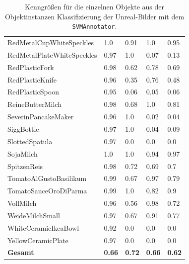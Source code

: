 \begin{table}
\begin{tabularx}{\textwidth}{Xllll}
RedMetalCupWhiteSpeckles & 1.0 & 0.91 & 1.0 & 0.95 \\  
RedMetalPlateWhiteSpeckles & 0.97 & 1.0 & 0.07 & 0.13 \\  
RedPlasticFork & 0.98 & 0.62 & 0.78 & 0.69 \\  
RedPlasticKnife & 0.96 & 0.35 & 0.76 & 0.48 \\  
RedPlasticSpoon & 0.95 & 0.06 & 0.05 & 0.06 \\  
ReineButterMilch & 0.98 & 0.68 & 1.0 & 0.81 \\  
SeverinPancakeMaker & 0.96 & 1.0 & 0.02 & 0.04 \\  
SiggBottle & 0.97 & 1.0 & 0.04 & 0.09 \\  
SlottedSpatula & 0.97 & 0.0 & 0.0 & 0.0 \\  
SojaMilch & 1.0 & 1.0 & 0.94 & 0.97 \\  
SpitzenReis & 0.98 & 0.72 & 0.69 & 0.7 \\  
TomatoAlGustoBasilikum & 0.99 & 0.67 & 0.97 & 0.79 \\  
TomatoSauceOroDiParma & 0.99 & 1.0 & 0.82 & 0.9 \\  
VollMilch & 0.96 & 0.56 & 0.98 & 0.72 \\  
WeideMilchSmall & 0.97 & 0.67 & 0.91 & 0.77 \\  
WhiteCeramicIkeaBowl & 0.92 & 0.0 & 0.0 & 0.0 \\  
YellowCeramicPlate & 0.97 & 0.0 & 0.0 & 0.0 \\      \hline
\textbf{Gesamt}		&	\textbf{0.66}   &	\textbf{0.72}  & \textbf{0.66}     &  \textbf{0.62}     \\
\end{tabularx}
\caption[Objektinstanzen-spezifische Kenngrößen des SVMAnnotators]{Kenngrößen für die einzelnen Objekte aus der Objektinstanzen Klassifizierung der Unreal-Bilder mit dem \texttt{SVMAnnotator}.}
\label{tab:SVMClassifierGTInstance_metrics}
\end{table}



